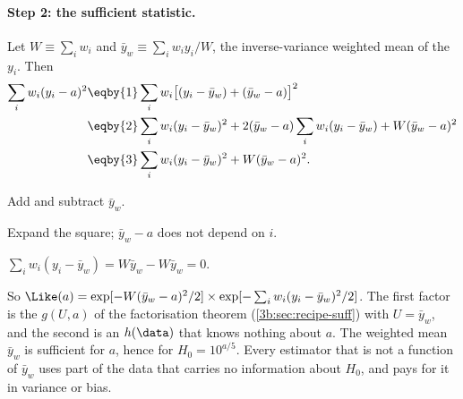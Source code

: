 \paragraph{Step 2: the sufficient statistic.}
Let $W\equiv\sum_iw_i$ and $\bar y_w\equiv\sum_iw_iy_i/W$, the
inverse-variance weighted mean of the $y_i$. Then
\begin{align}
  \sum_iw_i(y_i-a)^2
  &\eqby{1}\sum_iw_i\bigl[(y_i-\bar y_w)+(\bar y_w-a)\bigr]^2\nonumber\\
  &\eqby{2}\sum_iw_i(y_i-\bar y_w)^2+2(\bar y_w-a)\sum_iw_i(y_i-\bar y_w)+W(\bar y_w-a)^2\nonumber\\
  &\eqby{3}\sum_iw_i(y_i-\bar y_w)^2+W(\bar y_w-a)^2 .
  \label{3b:eq:sn-split}
\end{align}
\begin{explain}
  \item Add and subtract $\bar y_w$.
  \item Expand the square; $\bar y_w-a$ does not depend on $i$.
  \item $\sum_iw_i(y_i-\bar y_w)=W\bar y_w-W\bar y_w=0$.
\end{explain}
So $\Like(a)=\exp[-W(\bar y_w-a)^2/2]\times\exp[-\sum_iw_i(y_i-\bar y_w)^2/2]$.
The first factor is the $g(U,a)$ of the factorisation theorem
(\cref{3b:sec:recipe-suff}) with $U=\bar y_w$, and the second is an $h(\data)$
that knows nothing about $a$. The weighted mean $\bar y_w$ is sufficient for
$a$, hence for $H_0=10^{a/5}$. Every estimator that is not a function of
$\bar y_w$ uses part of the data that carries no information about $H_0$,
and pays for it in variance or bias.

